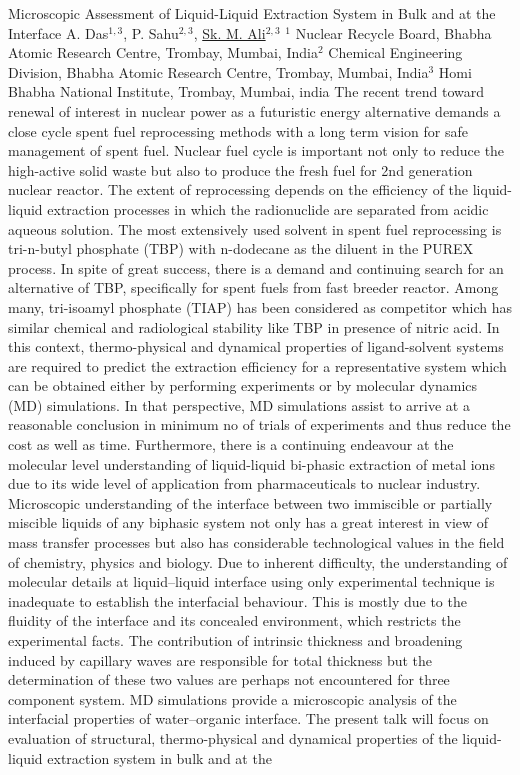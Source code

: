 
    \begin{abstract_online}{Microscopic Assessment of Liquid-Liquid Extraction System in Bulk and at the Interface}{%
        A. Das$^{1, 3}$, P. Sahu$^{2, 3}$, \underline{Sk. M. Ali}$^{2, 3}$}{%
        \IStag}{%
        $^1$ Nuclear Recycle Board, Bhabha Atomic Research Centre, Trombay, Mumbai, India\newline{}$^2$ Chemical Engineering Division, Bhabha Atomic Research Centre, Trombay, Mumbai, India\newline{}$^3$ Homi Bhabha National Institute, Trombay, Mumbai, india}
    The recent trend toward renewal of interest in nuclear power as a futuristic energy alternative demands a close cycle spent fuel  reprocessing  methods  with  a  long  term  vision  for  safe management of  spent  fuel.  Nuclear fuel cycle is important not only to reduce the high-active solid waste but also to produce the fresh fuel for 2nd generation nuclear reactor. The extent of reprocessing depends on the efficiency of the liquid-liquid extraction processes in which the radionuclide are separated from acidic aqueous solution. The most extensively used solvent in spent fuel reprocessing is tri-n-butyl phosphate (TBP) with n-dodecane as the diluent in the PUREX process. In spite of great success, there is a demand and continuing search for an alternative of TBP, specifically for spent fuels from fast  breeder reactor. Among many, tri-isoamyl phosphate (TIAP) has been considered as competitor which has similar chemical and radiological stability like TBP in presence of nitric acid. In this context, thermo-physical and dynamical properties of ligand-solvent systems are required to predict the extraction efficiency for a representative system which can be obtained either by performing experiments or by molecular dynamics (MD) simulations. In that perspective, MD simulations assist to arrive at a reasonable conclusion in minimum no of trials of experiments and thus reduce the cost as well as time. Furthermore, there is a continuing endeavour  at the molecular level understanding of liquid-liquid bi-phasic extraction of metal ions due to its wide level of application from pharmaceuticals to nuclear industry. Microscopic understanding of the interface between two immiscible or partially miscible liquids of any biphasic system not only has a great interest in view of mass transfer processes but also has considerable technological values in the field of chemistry, physics and biology. Due to inherent difficulty, the understanding of molecular details at liquid–liquid interface using only experimental technique is inadequate to establish the interfacial behaviour. This is mostly due to the fluidity of the interface and its concealed environment, which restricts the experimental facts. The contribution of intrinsic thickness and broadening induced by capillary waves are responsible for total thickness but the determination of these two values are perhaps not encountered for three component system. MD simulations provide a microscopic analysis of the interfacial properties of water–organic interface. The present talk will focus on evaluation of structural, thermo-physical and dynamical properties of the liquid-liquid extraction system in bulk and at the 
\end{abstract_online}

